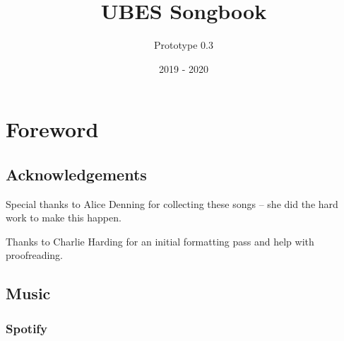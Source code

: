 \documentclass[9pt,twoside]{extarticle}
\title{UBES Songbook}
\author{Prototype 0.3}
\date{2019 - 2020}
\newcommand{\sectionbreak}{\clearpage}
\begin{document}
\raggedbottom
{}

\maketitle
\newpage

\section*{Foreword}

\subsection*{Acknowledgements}

\begin{center}
Special thanks to Alice Denning for collecting these songs -- she did the hard
work to make this happen.

Thanks to Charlie Harding for an initial formatting pass and help with
proofreading.
\end{center}

\subsection*{Music}

\begin{center}

\subsubsection*{Spotify}
\quad
{}

\end{center}
\newpage

\tableofcontents

\sectionbreak
{}
\end{document}
